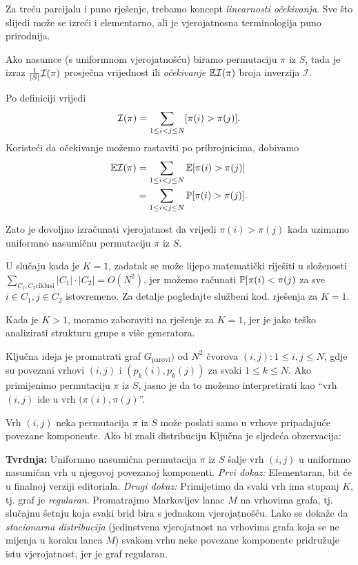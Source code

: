Za treću parcijalu i puno rješenje, trebamo koncept \textit{linearnosti
očekivanja}. Sve što slijedi može se izreći i elementarno,
ali je vjerojatnosna terminologija puno prirodnija.

Ako nasumce (s uniformnom vjerojatnošću) biramo permutaciju $\pi$ iz
$S$, tada je izraz $\frac{1}{|S|} \mathcal I(\pi)$ prosječna vrijednost
ili \textit{očekivanje} $\mathbb E\mathcal{I}(\pi)$ broja inverzija $\mathcal{I}$.

Po definiciji vrijedi
\begin{equation*}
  \mathcal I(\pi) = \sum\limits_{1 \le i < j \le N} [ \pi(i) > \pi(j) ]. 
\end{equation*}
Koristeći da očekivanje možemo rastaviti po pribrojnicima, dobivamo
\begin{align*}
  \mathbb E \mathcal I(\pi)  &= \sum\limits_{1 \le i < j \le N} \mathbb E [ \pi(i) > \pi(j) ] \\
                &= \sum\limits_{1 \le i < j \le N} \mathbb P [ \pi(i) > \pi(j) ]. 
\end{align*}

Zato je dovoljno izračunati vjerojatnost da vrijedi $\pi(i) > \pi(j)$
kada uzimamo uniformno nasumičnu permutaciju $\pi$ iz $S$.

U slučaju kada je $K = 1$, zadatak se može lijepo matematički riješiti
u složenosti $\sum_{C_1, C_2 \text{ciklusi}} |C_1| \cdot |C_2| 
= O(N^2)$, jer možemo računati $\mathbb P[\pi(i) < \pi(j)$ za
sve $i \in C_1, j \in C_2$ istovremeno. Za detalje pogledajte službeni kod.
rješenja za $K = 1$.

Kada je $K > 1$, moramo zaboraviti na rješenje za $K = 1$, jer je jako
teško analizirati strukturu grupe s više generatora.

Ključna ideja je promatrati graf $G_{\text{parovi}})$ 
od $N^2$ čvorova $(i, j) : 1 \le i, j \le N$,
gdje su povezani vrhovi $(i, j)$ i $(p_k(i), p_k(j))$ za svaki $1 \le k \le N$.
Ako primijenimo permutaciju $\pi$ iz $S$, jasno je da to možemo
interpretirati kao ``vrh $(i, j)$ ide u vrh $(\pi(i), \pi(j)$''.

Vrh $(i, j)$ neka permutacija $\pi$ iz $S$ 
može poslati samo u vrhove pripadajuće povezane komponente.
Ako bi znali distribuciju 
Ključna je sljedeća obzervacija:

\textbf{Tvrdnja:} Uniformno nasumična permutacija $\pi$ iz $S$ šalje
vrh $(i, j)$ u uniformno nasumičan vrh u njegovoj povezanoj komponenti.
\textit{Prvi dokaz:} Elementaran, bit će u finalnoj verziji editoriala.
\textit{Drugi dokaz:} Primijetimo da svaki vrh ima stupanj $K$,
tj. graf je \textit{regularan}.
Promatrajmo Markovljev lanac $M$ na vrhovima grafa,
tj. slučajnu šetnju koja svaki brid bira s jednakom vjerojatnošću.
Lako se dokaže da \textit{stacionarna distribucija} (jedinstvena
vjerojatnost na vrhovima grafa koja se ne mijenja u koraku lanca $M$)
svakom vrhu neke povezane komponente pridružuje istu vjerojatnost,
jer je graf regularan. 

